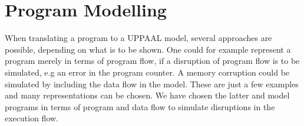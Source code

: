 \section{Program Modelling}
When translating a program to a UPPAAL model, several approaches are possible, depending on what is to be shown. One could for example represent a program merely in terms of program flow, if a disruption of program flow is to be simulated, e.g an error in the program counter. A memory corruption could be simulated by including the data flow in the model. These are just a few examples and many representations can be chosen. We have chosen the latter and model programs in terms of program and data flow to simulate disruptions in the execution flow.
%



